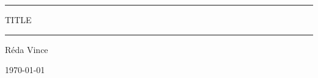 \begin{titlepage}
\begin{center}

\vspace*{1cm}

{\hrule height 1pt}
\vspace{2mm}
\Huge
TITLE\\
\Large
\vspace{8mm}
{\hrule height 1pt}

\vspace{2cm}

Réda Vince\\

\vfill
\large


\today

\end{center}
\end{titlepage}
